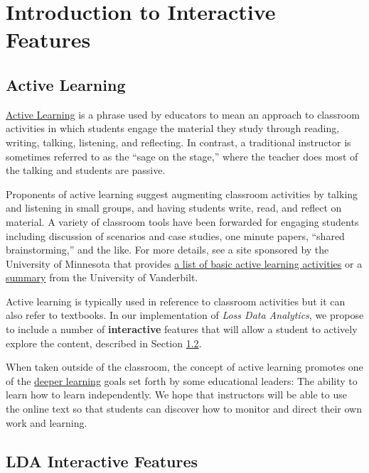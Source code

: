 \documentclass[]{article}
\title{}
\author{}
\date{}
\begin{document}
{
\setcounter{tocdepth}{3}
\tableofcontents
}
\section{Introduction to Interactive
Features}\label{introduction-to-interactive-features}

\subsection{Active Learning}\label{active-learning}

\href{https://cei.umn.edu/support-services/tutorials/what-active-learning}{Active
Learning} is a phrase used by educators to mean an approach to classroom
activities in which students engage the material they study through
reading, writing, talking, listening, and reflecting. In contrast, a
traditional instructor is sometimes referred to as the ``sage on the
stage,'' where the teacher does most of the talking and students are
passive.

Proponents of active learning suggest augmenting classroom activities by
talking and listening in small groups, and having students write, read,
and reflect on material. A variety of classroom tools have been
forwarded for engaging students including discussion of scenarios and
case studies, one minute papers, ``shared brainstorming,'' and the like.
For more details, see a site sponsored by the University of Minnesota
that provides \href{https://cei.umn.edu/active-learning}{a list of basic
active learning activities} or a
\href{https://cft.vanderbilt.edu/active-learning/}{summary} from the
University of Vanderbilt.

Active learning is typically used in reference to classroom activities
but it can also refer to textbooks. In our implementation of \emph{Loss
Data Analytics}, we propose to include a number of \textbf{interactive}
features that will allow a student to actively explore the content,
described in Section \ref{S:Features}.

When taken outside of the classroom, the concept of active learning
promotes one of the
\href{http://www.hewlett.org/programs/education/deeper-learning}{deeper
learning} goals set forth by some educational leaders: The ability to
learn how to learn independently. We hope that instructors will be able
to use the online text so that students can discover how to monitor and
direct their own work and learning.

\subsection{LDA Interactive Features}\label{S:Features}
\end{document}
